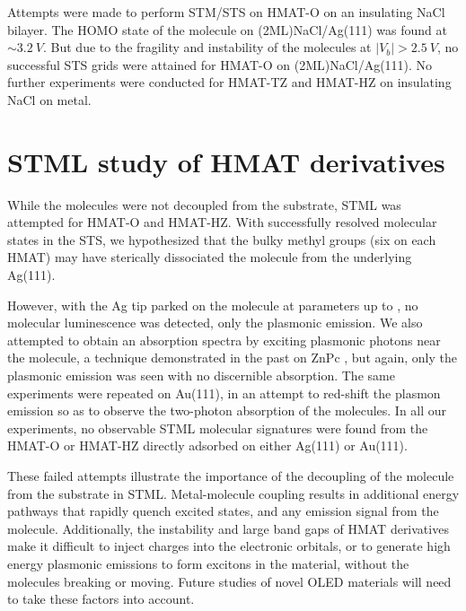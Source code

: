 Attempts were made to perform \ac{STM}/\ac{STS} on HMAT-O on an insulating NaCl bilayer. The HOMO state of the molecule on (2ML)NaCl/Ag(111) was found at $\sim \SI{3.2}{V}$. But due to the fragility and instability of the molecules at $|V_b| >\SI{2.5}{V}$, no successful STS grids were attained for HMAT-O on (2ML)NaCl/Ag(111). No further experiments were conducted for HMAT-TZ and HMAT-HZ on insulating NaCl on metal.





\section{{STML} study of HMAT derivatives}

While the molecules were not decoupled from the substrate, \ac{STML} was attempted for \ac{HMAT-O} and \ac{HMAT-HZ}. With successfully resolved molecular states in the \ac{STS}, we hypothesized that the bulky methyl groups (six on each \ac{HMAT}) may have sterically dissociated the molecule from the underlying Ag(111).

However, with the Ag tip parked on the molecule at parameters up to , no molecular luminescence was detected, only the plasmonic emission. We also attempted to obtain an absorption spectra by exciting plasmonic photons near the molecule, a technique demonstrated in the past on ZnPc \cite{zhang2017sub}, but again, only the plasmonic emission was seen with no discernible absorption. The same experiments were repeated on Au(111), in an attempt to red-shift the plasmon emission so as to observe the two-photon absorption of the molecules. In all our experiments, no observable \ac{STML} molecular signatures were found from the HMAT-O or HMAT-HZ directly adsorbed on either Ag(111) or Au(111). 

These failed attempts illustrate the importance of the decoupling of the molecule from the substrate in \ac{STML}. Metal-molecule coupling results in additional energy pathways that rapidly quench excited states, and any emission signal from the molecule. Additionally, the instability and large band gaps of \ac{HMAT} derivatives make it difficult to inject charges into the electronic orbitals, or to generate high energy plasmonic emissions to form excitons in the material, without the molecules breaking or moving. Future studies of novel \ac{OLED} materials will need to take these factors into account.




